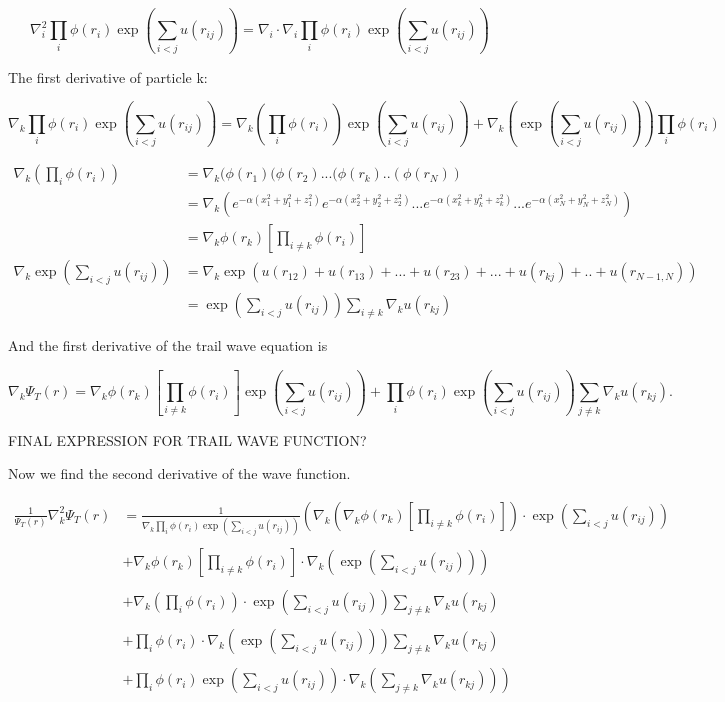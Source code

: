 \documentclass[a4paper,10pt,twoside]{report}
\begin{document}
$$\nabla_i^2 \prod_{i} \phi (r_i) \exp \left(\sum_{i<j}u(r_{ij})\right) = \nabla_i \cdot \nabla_i \prod_{i} \phi (r_i) \exp \left(\sum_{i<j}u(r_{ij})\right)$$

The first derivative of particle k:

$$\nabla_k \prod_{i} \phi (r_i) \exp \left(\sum_{i<j}u(r_{ij})\right) = \nabla_k \left( \prod_{i} \phi (r_i) \right) \exp \left(\sum_{i<j}u(r_{ij})\right) + \nabla_k \left(\exp \left(\sum_{i<j}u(r_{ij})\right)\right)  \prod_{i} \phi (r_i) $$

\begin{align*}
\nabla_k \left( \prod_{i} \phi (r_i) \right) &= \nabla_k (\phi(r_1)(\phi(r_2)...(\phi(r_k)..(\phi(r_N)) \\
&=\nabla_k \left(e^{-\alpha (x_1^2 + y_1^2 + z_1^2)} e^{-\alpha (x_2^2 + y_2^2 + z_2^2)} ... e^{-\alpha (x_k^2 + y_k^2 + z_k^2)} ... e^{-\alpha (x_N^2 + y_N^2 + z_N^2)}\right)\\
&=\nabla_k \phi(r_k) \left[\prod_{i\ne k} \phi(r_i)\right]\\
\nabla_k \exp \left(\sum_{i<j}u(r_{ij})\right) &= \nabla_k \exp (u(r_{12}) + u(r_{13}) + ... + u(r_{23}) + ... + u(r_{kj}) + .. + u(r_{N-1,N}) )\\
&=\exp \left(\sum_{i<j}u(r_{ij})\right) \sum_{i\ne k} \nabla_k u(r_{kj})
\end{align*}

And the first derivative of the trail wave equation is

$$\nabla_k \Psi_T(r) = \nabla_k \phi(r_k) \left[\prod_{i\ne k} \phi(r_i)\right] \exp \left(\sum_{i<j}u(r_{ij})\right) +  \prod_{i} \phi (r_i) \exp \left(\sum_{i<j}u(r_{ij})\right) \sum_{j\ne k} \nabla_k u(r_{kj}).$$

FINAL EXPRESSION FOR TRAIL WAVE FUNCTION?

Now we find the second derivative of the wave function.

\begin{align*}
\frac{1}{\Psi_T(r)}\nabla_k^2 \Psi_T(r) &= \frac{1}{\nabla_k \prod_{i} \phi (r_i) \exp \left(\sum_{i<j}u(r_{ij})\right)} \left( \nabla_k \left( \nabla_k \phi(r_k) \left[\prod_{i\ne k} \phi(r_i)\right] \right) \cdot \exp \left(\sum_{i<j}u(r_{ij})\right)  \right. \\
\\
&+\nabla_k \phi(r_k) \left[\prod_{i\ne k} \phi(r_i)\right] \cdot \nabla_k \left( \exp \left(\sum_{i<j}u(r_{ij})\right)\right)\\
\\
&+\nabla_k \left( \prod_{i} \phi (r_i) \right) \cdot \exp \left(\sum_{i<j}u(r_{ij})\right) \sum_{j\ne k} \nabla_k u(r_{kj}) \\
\\
&+ \prod_{i} \phi (r_i) \cdot \nabla_k \left(\exp \left(\sum_{i<j}u(r_{ij})\right)\right) \sum_{j\ne k} \nabla_k u(r_{kj})  \\
\\
&+ \left. \prod_{i} \phi (r_i) \exp \left(\sum_{i<j}u(r_{ij})\right) \cdot \nabla_k \left(\sum_{j\ne k} \nabla_k u(r_{kj}) \right) \right) \\
\end{align*}
\end{document}
